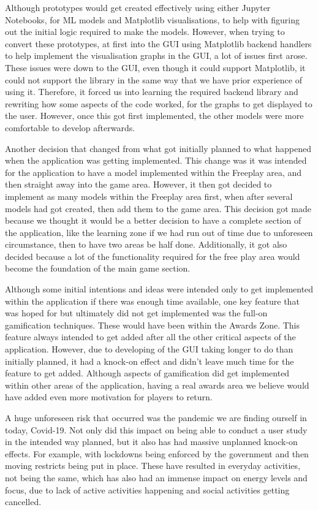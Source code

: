 		Although prototypes would get created effectively using either Jupyter Notebooks, for ML models and Matplotlib visualisations, to help with figuring out the initial logic required to make the models. However, when trying to convert these prototypes, at first into the GUI using Matplotlib backend handlers to help implement the visualisation graphs in the GUI, a lot of issues first arose. These issues were down to the GUI, even though it could support Matplotlib, it could not support the library in the same way that we have prior experience of using it. Therefore, it forced us into learning the required backend library and rewriting how some aspects of the code worked, for the graphs to get displayed to the user. However, once this got first implemented, the other models were more comfortable to develop afterwards. 

		Another decision that changed from what got initially planned to what happened when the application was getting implemented. This change was it was intended for the application to have a model implemented within the Freeplay area, and then straight away into the game area. However, it then got decided to implement as many models within the Freeplay area first, when after several models had got created, then add them to the game area. This decision got made because we thought it would be a better decision to have a complete section of the application, like the learning zone if we had run out of time due to unforeseen circumstance, then to have two areas be half done. Additionally, it got also decided because a lot of the functionality required for the free play area would become the foundation of the main game section.

		Although some initial intentions and ideas were intended only to get implemented within the application if there was enough time available, one key feature that was hoped for but ultimately did not get implemented was the full-on gamification techniques. These would have been within the Awards Zone. This feature always intended to get added after all the other critical aspects of the application. However, due to developing of the GUI taking longer to do than initially planned, it had a knock-on effect and didn't leave much time for the feature to get added. Although aspects of gamification did get implemented within other areas of the application, having a real awards area we believe would have added even more motivation for players to return. 

		A huge unforeseen risk that occurred was the pandemic we are finding ourself in today, Covid-19. Not only did this impact on being able to conduct a user study in the intended way planned, but it also has had massive unplanned knock-on effects. For example, with lockdowns being enforced by the government and then moving restricts being put in place. These have resulted in everyday activities, not being the same, which has also had an immense impact on energy levels and focus, due to lack of active activities happening and social activities getting cancelled.
		
